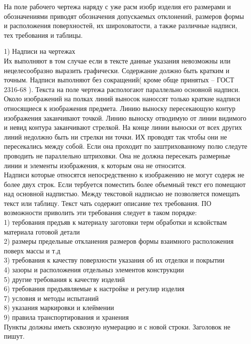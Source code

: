 \documentclass[a4paper, 12pt]{article}
\begin{document}
На поле рабочего чертежа наряду с уже расм изобр изделия его размерами и обозначениями приводят обозначения допускаемых отклонений, размеров формы и расположения поверхностей, их широховатости, а также различные надписи, тех требования и таблицы.

1) Надписи на чертежах\\
Их выполняют в том случае если в тексте данные указания невозможны или нецелесообразно выразить графически. Содержание должно быть кратким и точным. Надписи выполняют без сокращений( кроме обще принятых -- ГОСТ 2316-68 ). Текста на поле чертежа распологают параллельно основной надписи. Около изображений на полках линий выносок наноссят только краткие надписи относящиеся к изображения предмета. Линию выноску пересекающую контур изображения заканчивают точкой. Линию выноску отводимую от линии видимого и невид контура заканчивают стрелкой. На конце линии выноски от всех других линий недолжно быть ни стрелки ни точки. ИХ проводят так чтобы они не пересекались между собой. Если она проходит по заштрихованному полю следуте проводить не параллельно штриховки. Она не должна пересекать размерные линии и элементы изображения, к которым она не относится.\\
Надписи которые относятся непосредственно к изображению не могут содерж не более двух строк. Если тербуется поместить более объемный текст его помещают над основной надпистью. Между текстовой надписью не позволяется помещать текст или таблицу. Текст чать содержит описание тех требования. ПО возможности приволить эти требования следует в таком порядке:\\
1) тербования предъяв к материалу заготовки терм обработки и ксвойствам материала готовой детали\\
2) размеры предельные откланения размеров формы взаимного расположения поверх массы и т.д\\
3) требования к качеству поверхности указания об их отделки и покрытии\\
4) зазоры и расположения отдельныз элементов конструкции\\
5) другие требования к качеству изделий\\
6) требования предъявляемые к настройке и регулир изделия\\
7) условия и методы испытаний\\
8) указания маркировки и клеймении\\
9) правила транспортирования и хранения\\
Пункты должны иметь сквозную нумерацию и с новой строки. Заголовок не пишут.\\
\end{document}
